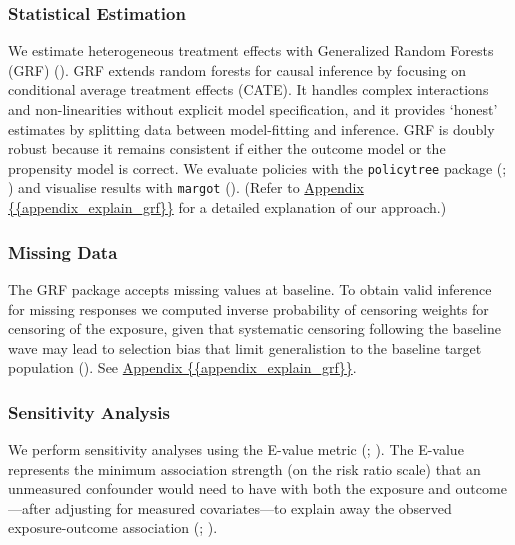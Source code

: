 \documentclass[
  single column]{article}
\begin{document}
\subsubsection{Statistical Estimation}\label{statistical-estimation}

We estimate heterogeneous treatment effects with Generalized Random
Forests (GRF) (). GRF
extends random forests for causal inference by focusing on conditional
average treatment effects (CATE). It handles complex interactions and
non-linearities without explicit model specification, and it provides
`honest' estimates by splitting data between model-fitting and
inference. GRF is doubly robust because it remains consistent if either
the outcome model or the propensity model is correct. We evaluate
policies with the \texttt{policytree} package
(; )
and visualise results with \texttt{margot}
(). (Refer to
\hyperref[appendix-explain-grf]{Appendix \{\{appendix\_explain\_grf\}\}}
for a detailed explanation of our approach.)

\subsubsection{Missing Data}\label{missing-data}

The GRF package accepts missing values at baseline. To obtain valid
inference for missing responses we computed inverse probability of
censoring weights for censoring of the exposure, given that systematic
censoring following the baseline wave may lead to selection bias that
limit generalistion to the baseline target population
(). See
\hyperref[appendix-explain-grf]{Appendix
\{\{appendix\_explain\_grf\}\}}.

\subsubsection{Sensitivity Analysis}\label{sensitivity-analysis}

We perform sensitivity analyses using the E-value metric
(;
). The E-value
represents the minimum association strength (on the risk ratio scale)
that an unmeasured confounder would need to have with both the exposure
and outcome---after adjusting for measured covariates---to explain away
the observed exposure-outcome association
(;
).
\end{document}
